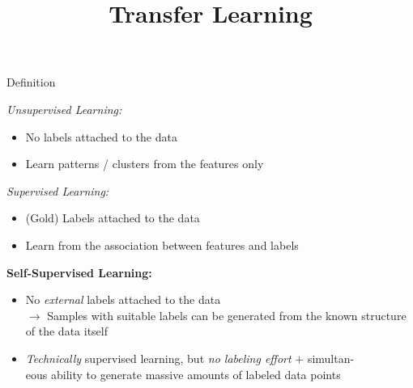 


\usepackage{colortbl}

\newcommand{\titlefigure}{figure/selfsup.jpg}
\newcommand{\learninggoals}{
\item Understand the difference to other learning paradigms
\item Learn to recognize self-supervision when you see it}

\title{Transfer Learning}
\date{}




\begin{frame}{Definition}

	\vfill 
	
	\textit{Unsupervised Learning:}

	\begin{itemize}
		\item No labels attached to the data
		\item Learn patterns / clusters from the features only
	\end{itemize}
	
	\textit{Supervised Learning:}

	\begin{itemize}
		\item (Gold) Labels attached to the data
		\item Learn from the association between features and labels
	\end{itemize}
	
	\textbf{Self-Supervised Learning:}

	\begin{itemize}
		\item No \textit{external} labels attached to the data\\
					$\to$ Samples with suitable labels can be generated from the known structure of the data itself 
		\item \textit{Technically} supervised learning, but \textit{no labeling effort} $+$ simultan-\\eous ability to generate massive amounts of labeled data points
	\end{itemize}
	
	\vfill 
	
\end{frame}

